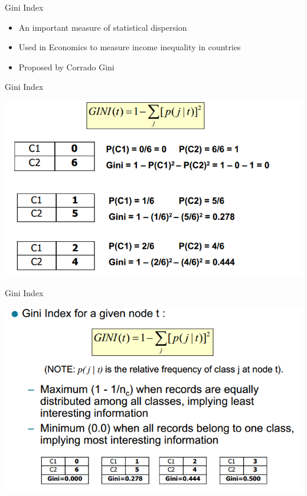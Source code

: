 \documentclass{beamer}
\begin{document}
\begin{frame}{Gini Index}
    \begin{itemize}
        \item An important measure of statistical dispersion
        \item Used in Economics to measure income inequality in countries
        \item Proposed by Corrado Gini 
    \end{itemize}
\end{frame}
\begin{frame}{Gini Index}
    \begin{center}
        \includegraphics[scale=0.4]{giniIndex2.png}
    \end{center}
\end{frame}
\begin{frame}{Gini Index}
    \begin{center}
        \includegraphics[scale=0.4]{giniIndex1.png}
    \end{center}
\end{frame}
\end{document}
